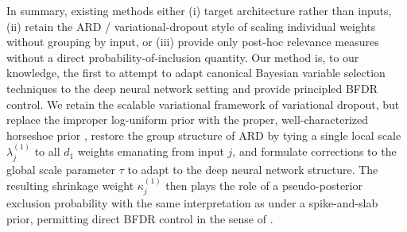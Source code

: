 In summary, existing methods either (i) target architecture rather
than inputs, (ii) retain the ARD / variational-dropout style of
scaling individual weights without grouping by input, or (iii)
provide only post-hoc relevance measures without a direct
probability-of-inclusion quantity.  Our method is, to our knowledge,
the first to attempt to adapt canonical Bayesian variable selection techniques to the deep neural network setting and provide principled BFDR
control.  We retain the scalable variational framework of
variational dropout, but replace the improper log-uniform prior with
the proper, well-characterized horseshoe prior
\citep{carvalho_horseshoe_2010}, restore the group structure of
ARD by tying a single local scale $\lambda_j^{(1)}$ to all $d_1$
weights emanating from input $j$, and formulate corrections to the global scale parameter $\tau$ to adapt to the deep neural network structure.  The resulting shrinkage weight
$\kappa_j^{(1)}$ then plays the role of a pseudo-posterior exclusion
probability with the same interpretation as under a spike-and-slab
prior, permitting direct BFDR control in the sense of
\citet{bernardo_fdr_2007}.






